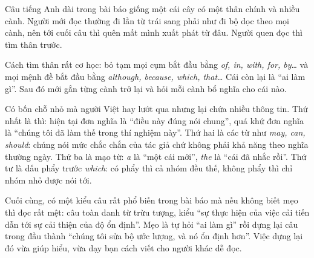 \documentclass[../../english.tex]{subfiles}
\begin{document}
\begin{dongian}
Câu tiếng Anh dài trong bài báo giống một cái cây có một thân chính và nhiều cành. Người mới đọc thường đi lần từ trái sang phải như đi bộ dọc theo mọi cành, nên tới cuối câu thì quên mất mình xuất phát từ đâu. Người quen đọc thì tìm thân trước.

Cách tìm thân rất cơ học: bỏ tạm mọi cụm bắt đầu bằng \emph{of, in, with, for, by}\ldots{} và mọi mệnh đề bắt đầu bằng \emph{although, because, which, that}\ldots{} Cái còn lại là ``ai làm gì''. Sau đó mới gắn từng cành trở lại và hỏi mỗi cành bổ nghĩa cho cái nào.

Có bốn chỗ nhỏ mà người Việt hay lướt qua nhưng lại chứa nhiều thông tin. Thứ nhất là thì: hiện tại đơn nghĩa là ``điều này đúng nói chung'', quá khứ đơn nghĩa là ``chúng tôi đã làm thế trong thí nghiệm này''. Thứ hai là các từ như \emph{may, can, should}: chúng nói mức chắc chắn của tác giả chứ không phải khả năng theo nghĩa thường ngày. Thứ ba là mạo từ: \emph{a} là ``một cái mới'', \emph{the} là ``cái đã nhắc rồi''. Thứ tư là dấu phẩy trước \emph{which}: có phẩy thì cả nhóm đều thế, không phẩy thì chỉ nhóm nhỏ được nói tới.

Cuối cùng, có một kiểu câu rất phổ biến trong bài báo mà nếu không biết mẹo thì đọc rất mệt: câu toàn danh từ trừu tượng, kiểu ``sự thực hiện của việc cải tiến dẫn tới sự cải thiện của độ ổn định''. Mẹo là tự hỏi ``ai làm gì'' rồi dựng lại câu trong đầu thành ``chúng tôi sửa bộ ước lượng, và nó ổn định hơn''. Việc dựng lại đó vừa giúp hiểu, vừa dạy bạn cách viết cho người khác dễ đọc.
\end{dongian}
\end{document}
